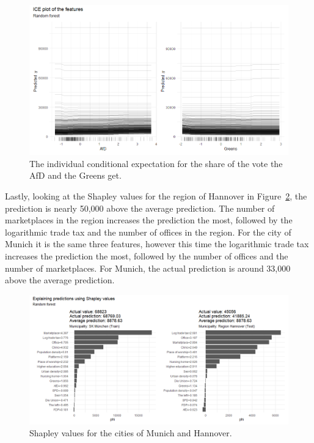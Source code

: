 \begin{figure}[H]
  \centering
  \includegraphics[width = \textwidth]{ice_rf_germany_3.png}
  \caption{The individual conditional expectation for the share of the vote the AfD and the Greens get.}
  \label{ice_rf_germany_3}
\end{figure}
Lastly, looking at the Shapley values for the region of Hannover in Figure~\ref{shapley_rf_germany}, the prediction is nearly 50,000 above the average prediction. The number of marketplaces in the region increases the prediction the most, followed by the logarithmic trade tax and the number of offices in the region. For the city of Munich it is the same three features, however this time the logarithmic trade tax increases the prediction the most, followed by the number of offices and the number of marketplaces. For Munich, the actual prediction is around 33,000 above the average prediction.
\begin{figure}[H]
  \centering
  \includegraphics[width = \textwidth]{shapley_rf_germany.png}
  \caption{Shapley values for the cities of Munich and Hannover.}
  \label{shapley_rf_germany}
\end{figure}
